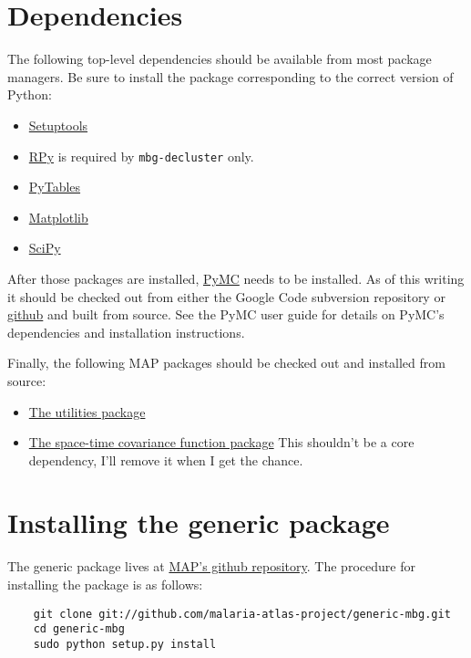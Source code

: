 \section{Dependencies}

The following top-level dependencies should be available from most package managers. Be sure to install the package corresponding to the correct version of Python:
\begin{itemize}
    \item \href{http://pypi.python.org/pypi/setuptools}{Setuptools} 
    \item \href{http://rpy.sourceforge.net}{RPy} is required by \texttt{mbg-decluster} only. 
    \item \href{http://www.pytables.org}{PyTables}
    \item \href{http://matplotlib.sourceforge.net}{Matplotlib}  
    \item \href{http://www.scipy.org}{SciPy} 
\end{itemize}

After those packages are installed, \href{http://code.google.com/p/pymc}{PyMC} needs to be installed. As of this writing it should be checked out from either the Google Code subversion repository or \href{http://github.com/pymc-devs/pymc}{github} and built from source. See the PyMC user guide for details on PyMC's dependencies and installation instructions.

Finally, the following MAP packages should be checked out and installed from source:
\begin{itemize}
    \item \href{http://github.com/malaria-atlas-project/map_utils}{The utilities package} 
    \item \href{http://github.com/malaria-atlas-project/st-cov-fun}{The space-time covariance function package} This shouldn't be a core dependency, I'll remove it when I get the chance.
\end{itemize}

\section{Installing the generic package}
The generic package lives at \href{http://github.com/malaria-atlas-project/generic-mbg}{MAP's github repository}. The procedure for installing the package is as follows:

\begin{verbatim}
    git clone git://github.com/malaria-atlas-project/generic-mbg.git
    cd generic-mbg
    sudo python setup.py install
\end{verbatim}

